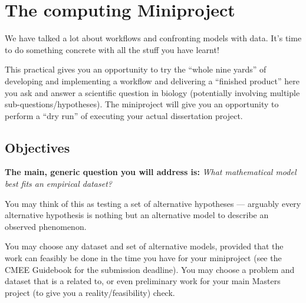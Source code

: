 \chapter{The computing Miniproject}
\label{chap:miniproj}


We have talked a lot about workflows and confronting models with data. 
It's time to do something concrete with all the stuff you have learnt!

This practical gives you an opportunity to try the ``whole nine yards'' 
of developing and implementing a workflow and delivering a ``finished 
product'' here you ask and answer a scientific question in biology 
(potentially involving multiple sub-questions/hypotheses). The 
miniproject will give you an opportunity to perform a ``dry run'' of 
executing your actual dissertation project.

\section {Objectives}

{\bf The main, generic question you will address is:} {\it What 
mathematical model best fits an empirical dataset?} 

You may think of this as testing a set of alternative hypotheses --- 
arguably every alternative hypothesis is nothing but an alternative model to 
describe an observed phenomenon. 
 
You may choose any dataset and set of alternative models, provided that 
the work can feasibly be done in the time you have for your miniproject 
(see the CMEE Guidebook for the submission deadline). You may choose a 
problem and dataset that is a related to, or even preliminary work for 
your main Masters project (to give you a reality/feasibility) check.  

